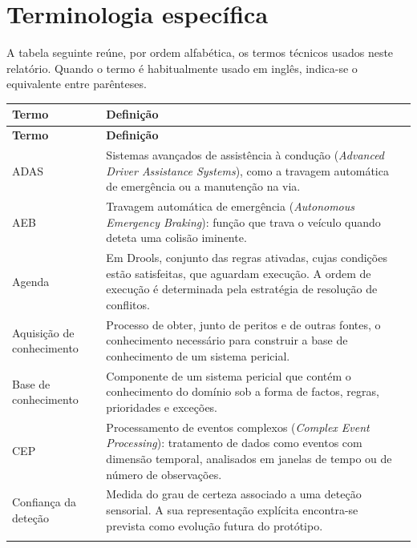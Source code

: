 \chapter*{Terminologia específica}
\label{cap:glossario}

A tabela seguinte reúne, por ordem alfabética, os termos técnicos usados
neste relatório. Quando o termo é habitualmente usado em inglês, indica-se o
equivalente entre parênteses.

{\small
\begin{longtable}{@{}L{4.4cm}VL{10.0cm}@{}}
  \toprule
  \textbf{Termo} & \textbf{Definição} \\
  \midrule
  \endfirsthead
  \toprule
  \textbf{Termo} & \textbf{Definição} \\
  \midrule
  \endhead
  \bottomrule
  \endfoot
  ADAS
    & Sistemas avançados de assistência à condução (\emph{Advanced Driver
      Assistance Systems}), como a travagem automática de emergência ou a
      manutenção na via. \\ \linhasep
  AEB
    & Travagem automática de emergência (\emph{Autonomous Emergency
      Braking}): função que trava o veículo quando deteta uma colisão
      iminente. \\ \linhasep
  Agenda
    & Em Drools, conjunto das regras ativadas, cujas condições estão
      satisfeitas, que aguardam execução. A ordem de execução é
      determinada pela estratégia de resolução de conflitos. \\ \linhasep
  Aquisição de conhecimento
    & Processo de obter, junto de peritos e de outras fontes, o
      conhecimento necessário para construir a base de conhecimento de um
      sistema pericial. \\ \linhasep
  Base de conhecimento
    & Componente de um sistema pericial que contém o conhecimento do
      domínio sob a forma de factos, regras, prioridades e exceções. \\ \linhasep
  CEP
    & Processamento de eventos complexos (\emph{Complex Event Processing}):
      tratamento de dados como eventos com dimensão temporal, analisados em
      janelas de tempo ou de número de observações. \\ \linhasep
  Confiança da deteção
    & Medida do grau de certeza associado a uma deteção sensorial. A sua
      representação explícita encontra-se prevista como evolução futura do
      protótipo. \\ \linhasep

\end{longtable}}
